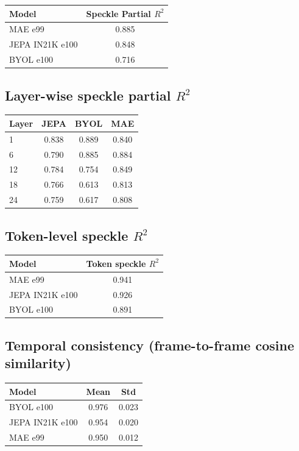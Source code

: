 \documentclass{article}
\begin{document}
\begin{center}
\begin{tabular}{lc}
\toprule
Model & Speckle Partial $R^2$ \\
\midrule
MAE e99        & 0.885 \\
JEPA IN21K e100 & 0.848 \\
BYOL e100      & 0.716 \\
\bottomrule
\end{tabular}
\end{center}

\subsection{Layer-wise speckle partial $R^2$}

\begin{center}
\begin{tabular}{lccc}
\toprule
Layer & JEPA & BYOL & MAE \\
\midrule
1  & 0.838 & 0.889 & 0.840 \\
6  & 0.790 & 0.885 & 0.884 \\
12 & 0.784 & 0.754 & 0.849 \\
18 & 0.766 & 0.613 & 0.813 \\
24 & 0.759 & 0.617 & 0.808 \\
\bottomrule
\end{tabular}
\end{center}

\subsection{Token-level speckle $R^2$}

\begin{center}
\begin{tabular}{lc}
\toprule
Model & Token speckle $R^2$ \\
\midrule
MAE e99        & 0.941 \\
JEPA IN21K e100 & 0.926 \\
BYOL e100      & 0.891 \\
\bottomrule
\end{tabular}
\end{center}

\subsection{Temporal consistency (frame-to-frame cosine similarity)}

\begin{center}
\begin{tabular}{lcc}
\toprule
Model & Mean & Std \\
\midrule
BYOL e100       & 0.976 & 0.023 \\
JEPA IN21K e100 & 0.954 & 0.020 \\
MAE e99         & 0.950 & 0.012 \\
\bottomrule
\end{tabular}
\end{center}
\end{document}
